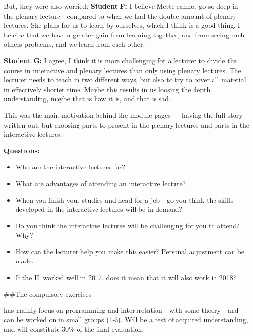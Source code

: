 \documentclass[
  ignorenonframetext,
]{beamer}
\providecommand{\tightlist}{%
  \setlength{\itemsep}{0pt}\setlength{\parskip}{0pt}}
\begin{document}
\begin{frame}
\begin{block}{But, they were also worried:}
\protect\hypertarget{but-they-were-also-worried}{}
\textbf{Student F:} I believe Mette cannot go so deep in the plenary
lecture - compared to when we had the double amount of plenary lectures.
She plans for us to learn by ourselves, which I think is a good thing. I
beleive that we have a greater gain from learning together, and from
seeing each others problems, and we learn from each other.

\textbf{Student G:} I agree, I think it is more challenging for a
lecturer to divide the course in interactive and plenary lectures than
only using plenary lectures. The lecturer needs to teach in two
different ways, but also to try to cover all material in effectively
shorter time. Maybe this results in us loosing the depth understanding,
maybe that is how it is, and that is sad.

This was the main motivation behind the module pages --- having the full
story written out, but choosing parts to present in the plenary lectures
and parts in the interactive lectures.
\end{block}
\end{frame}

\begin{frame}
\textbf{Questions:}

\begin{itemize}
\tightlist
\item
  Who are the interactive lectures for?
\item
  What are advantages of attending an interactive lecture?
\item
  When you finish your studies and head for a job - go you think the
  skills developed in the interactive lectures will be in demand?
\item
  Do you think the interactive lectures will be challenging for you to
  attend? Why?
\item
  How can the lecturer help you make this easier? Personal adjustment
  can be made.
\item
  If the IL worked well in 2017, does it mean that it will also work in
  2018?
\end{itemize}
\end{frame}

\begin{frame}
\#\#The compulsory exercises

has mainly focus on programming and interpretation - with some theory -
and can be worked on in small groups (1-3). Will be a test of acquired
understanding, and will constitute 30\% of the final evaluation.
\end{frame}
\end{document}
